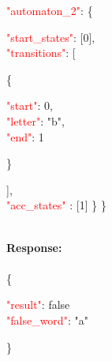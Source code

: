    \begin{adjustwidth}{7.5 mm}{0 cm}

   \textcolor{red}{"automaton\_2"}: \{
     \begin{adjustwidth}{7.5 mm}{0 cm}
            \textcolor{red}{"start\_states"}: [0],\\
            \textcolor{red}{"transitions"}: [
            \begin{adjustwidth}{7.5 mm}{0 cm}
            \{
               \begin{adjustwidth}{7.5 mm}{0 cm}
                    \textcolor{red}{"start"}: 0,\\
                    \textcolor{red}{"letter"}: "b",\\
                    \textcolor{red}{"end"}: 1
               \end{adjustwidth}
            \}
            \end{adjustwidth}
            ],\\
        \textcolor{red}{"acc\_states" }: [1]  \} \}
    \end{adjustwidth}
\end{adjustwidth}
\ \\
\textbf{Response:}\\
\ \\
\{
\begin{adjustwidth}{7.5 mm}{0 cm}
    \textcolor{red}{"result"}: false\\
    \textcolor{red}{"false\_word"}: "a"\\
\end{adjustwidth}
\}


